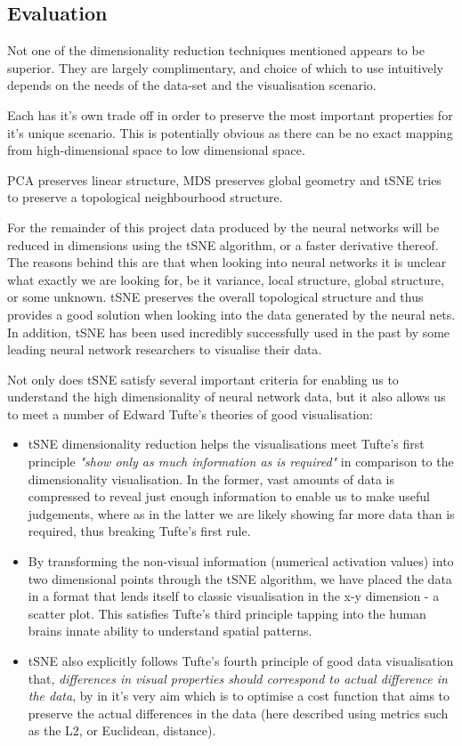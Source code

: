 \documentclass[a4paper,11pt,titlepage]{article}
\begin{document}
	\subsection{Evaluation}
	Not one of the dimensionality reduction techniques mentioned appears to be superior. They are largely complimentary, and choice of which to use intuitively depends on the needs of the data-set and the visualisation scenario. 
	\par 
	Each has it's own trade off in order to preserve the most important properties for it's unique scenario. This is potentially obvious as there can be no exact mapping from high-dimensional space to low dimensional space. 
		\par 
		PCA preserves linear structure, MDS preserves global geometry and tSNE tries to preserve a topological neighbourhood structure.
		\par 
		For the remainder of this project data produced by the neural networks will be reduced in dimensions using the tSNE algorithm, or a faster derivative thereof. The reasons behind this are that when looking into neural networks it is unclear what exactly we are looking for, be it variance, local structure, global structure, or some unknown. tSNE preserves the overall topological structure and thus provides a good solution when looking into the data generated by the neural nets. In addition, tSNE has been used incredibly successfully used in the past by some leading neural network researchers to visualise their data\cite{Maaten2008}.
		\par 
		Not only does tSNE satisfy several important criteria for enabling us to understand the high dimensionality of neural network data, but it also allows us to meet a number of Edward Tufte's theories of good visualisation:
		\begin{itemize}
			\item tSNE dimensionality reduction helps the visualisations meet Tufte's first principle \textit{"show only as much information as is required"} in comparison to the dimensionality visualisation. In the former, vast amounts of data is compressed to reveal just enough information to enable us to make useful judgements, where as in the latter we are likely showing far more data than is required, thus breaking Tufte's first rule.
			\item By transforming the non-visual information (numerical activation values) into two dimensional points through the tSNE algorithm, we have placed the data in a format that lends itself to classic visualisation in the x-y dimension - a scatter plot. This satisfies Tufte's third principle tapping into the human brains innate ability to understand spatial patterns.
			\item tSNE also explicitly follows Tufte's fourth principle of good data visualisation that, \textit{differences in visual properties should correspond to actual difference in the data}, by in it's very aim which is to optimise a cost function that aims to preserve the actual differences in the data (here described using metrics such as the L2, or Euclidean, distance).
		\end{itemize}
\end{document}
